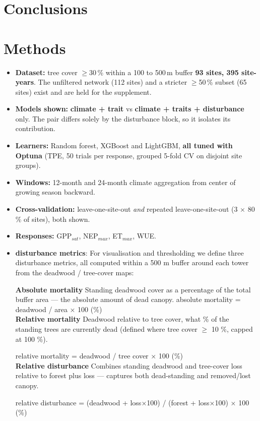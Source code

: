 \documentclass[11pt,a4paper]{article}
\begin{document}
\section*{Conclusions}
\section*{Methods}
\begin{itemize}
  \item \textbf{Dataset:} tree cover $\geq$30\,\% within a 100 to 500\,m buffer  \textbf{93 sites, 395 site-years}.
        The unfiltered network (112 sites) and a stricter $\geq$50\,\% subset (65 sites) exist and are held
        for the supplement.
  \item \textbf{Models shown:} \textbf{climate + trait} vs \textbf{climate + traits + disturbance} only.
        The pair differs solely by the disturbance block, so it isolates its contribution.
  \item \textbf{Learners:} Random forest, XGBoost and LightGBM, \textbf{all tuned with Optuna} (TPE, 50 trials
        per response, grouped 5-fold CV on disjoint site groups).
  \item \textbf{Windows:} 12-month and 24-month climate aggregation from center of growing season backward.
  \item \textbf{Cross-validation:} leave-one-site-out \emph{and} repeated leave-one-site-out
        (3 $\times$ 80\,\% of sites), both shown.
  \item \textbf{Responses:} GPP$_{sat}$, NEP$_{max}$, ET$_{max}$, WUE.

  \item \textbf{disturbance metrics}: For visualisation and thresholding we define three disturbance metrics, all computed within a 500 m buffer around each tower from the deadwood / tree-cover maps:

\textbf{Absolute mortality}
Standing deadwood cover as a percentage of the total buffer area — the absolute amount of dead canopy.
absolute mortality = deadwood / area × 100 (\%)
\\
\textbf{Relative mortality}
Deadwood relative to tree cover, what \% of the standing trees are currently dead (defined where tree cover $\geq$ 10 \%, capped at 100 \%).

relative mortality = deadwood / tree cover × 100 (\%)
\\
\textbf{Relative disturbance}
Combines standing deadwood and tree-cover loss relative to forest plus loss — captures both dead-standing and removed/lost canopy.

relative disturbance = (deadwood + loss×100) / (forest + loss×100) × 100 (\%)
 
\end{itemize}
\end{document}
